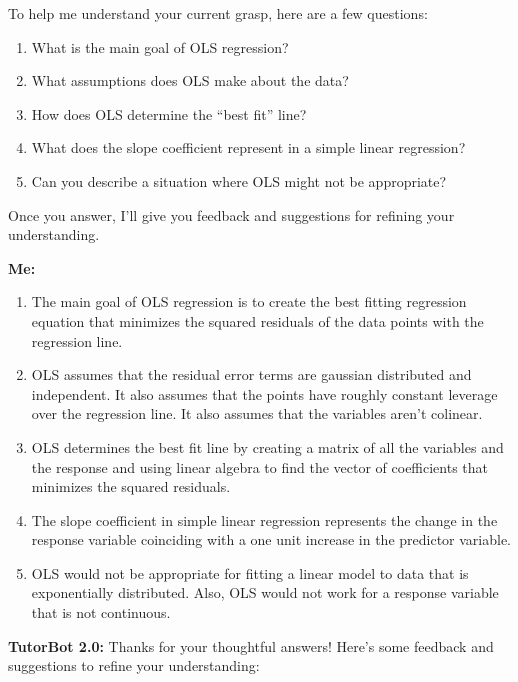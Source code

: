 \documentclass{article}\usepackage[]{graphicx}\usepackage[]{xcolor}
\begin{document}
\begin{enumerate}
\begin{tcolorbox}[breakable]
To help me understand your current grasp, here are a few questions:

\begin{enumerate}
\item What is the main goal of OLS regression?

\item What assumptions does OLS make about the data?
\item How does OLS determine the “best fit” line?
\item What does the slope coefficient represent in a simple linear regression?
\item Can you describe a situation where OLS might not be appropriate?
\end{enumerate}
Once you answer, I’ll give you feedback and suggestions for refining your understanding.
  \end{tcolorbox}
  \begin{tcolorbox}[breakable]
    \textbf{Me:} 
    \begin{enumerate}
    \item The main goal of OLS regression is to create the best fitting regression equation that minimizes the squared residuals of the data points with the regression line.
    \item OLS assumes that the residual error terms are gaussian distributed and independent. It also assumes that the points have roughly constant leverage over the regression line. It also assumes that the variables aren't colinear. 
    \item OLS determines the best fit line by creating a matrix of all the variables and the response and using linear algebra to find the vector of coefficients that minimizes the squared residuals. 
    \item The slope coefficient in simple linear regression represents the change in the response variable coinciding with a one unit increase in the predictor variable. 
    \item OLS would not be appropriate for fitting a linear model to data that is exponentially distributed. Also, OLS would not work for a response variable that is not continuous.
    \end{enumerate}
  \end{tcolorbox}
  \begin{tcolorbox}[breakable]
    \textbf{TutorBot 2.0:} Thanks for your thoughtful answers! Here’s some feedback and suggestions to refine your understanding: \\


\end{tcolorbox}
\end{enumerate}
\end{document}
